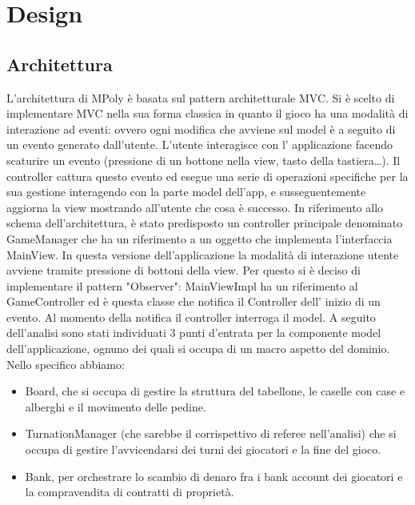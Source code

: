 \chapter{Design}

\section{Architettura}
L’architettura di MPoly è basata sul pattern architetturale MVC.\newline
Si è scelto di implementare MVC nella sua forma classica in quanto il gioco 
ha una modalità di interazione ad eventi: ovvero ogni modifica che avviene sul model è a seguito di un evento generato
dall'utente.\newline
L’utente interagisce con l' applicazione facendo scaturire un evento (pressione di un bottone nella view, tasto della tastiera\dots).
Il controller cattura questo evento ed esegue una serie di operazioni 
specifiche per la sua gestione interagendo con la parte model dell'app, e susseguentemente aggiorna la view 
mostrando all’utente che cosa è successo.\newline   
In riferimento allo schema dell'architettura, è stato predisposto un controller principale denominato GameManager 
che ha un riferimento a un oggetto che implementa l'interfaccia MainView.\newline
In questa versione dell'applicazione la modalità di interazione utente avviene tramite pressione di bottoni della view.
Per questo si è deciso di implementare il pattern "Observer": MainViewImpl ha un riferimento al GameController ed è questa classe 
che notifica il Controller dell' inizio di un evento.
Al momento della notifica il controller interroga il model.\newline
A seguito dell'analisi sono stati individuati 3 punti d'entrata per la componente model dell'applicazione,
ognuno dei quali si occupa di un macro aspetto del dominio. 
Nello specifico abbiamo:
\begin{itemize}
    \item Board, che si occupa di gestire la struttura del tabellone, le caselle con case e alberghi e il movimento delle 
    pedine.
    \item TurnationManager (che sarebbe il corrispettivo di referee nell'analisi)
    che si occupa di gestire l'avvicendarsi dei turni dei giocatori e la fine del gioco.
    \item Bank, per orchestrare lo scambio di denaro fra i bank account dei giocatori e 
    la compravendita di contratti di proprietà.
\end{itemize} 
